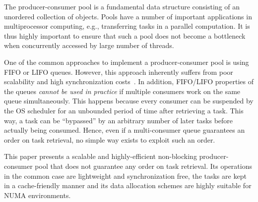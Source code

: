 The producer-consumer pool is a fundamental data structure consisting of an unordered collection of objects. Pools have a number of important
applications in multiprocessor computing, e.g., transferring tasks in a parallel computation. 
It is thus highly important to ensure that such a pool does not become a bottleneck when concurrently accessed 
by large number of threads. 

One of the common approaches to implement a producer-consumer pool is using FIFO or LIFO queues. 
However, this approach inherently suffers from poor scalability and high synchronization costs~\cite{Afek:2010:SPP:1885276.1885295,Basin:2011:CST:2075029.2075087,Sundell:2011:LAC:1989493.1989550}. 
In addition, FIFO/LIFO properties of the queues \emph{cannot be used in practice} if multiple consumers
work on the same queue simultaneously.
This happens because every consumer can be suspended by the OS scheduler for an unbounded period of time after retrieving a task.
This way, a task can be ``bypassed'' by an arbitrary number of later tasks before actually being consumed. 
Hence, even if a multi-consumer queue guarantees an order on task retrieval, no simple way exists to exploit such an order. 

This paper presents a scalable and highly-efficient non-blocking producer-consumer pool that does not guarantee any order on task retrieval.
Its operations in the common case are lightweight and synchronization free, the tasks are kept in a cache-friendly manner and its data allocation schemes are highly suitable for NUMA environments. 


